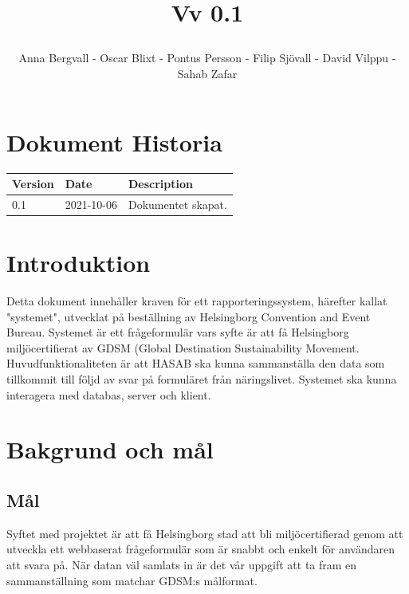 \documentclass{article}
\date {#1}
\title {
    \documentNumber {01}    

    \documentTitle {Helsingborg Event and Convention Bureau}
    
    \documentDate {2021-08-20}
    \documentVersion Vv 0.1
    
    \author{Anna Bergvall - Oscar Blixt - Pontus Persson - Filip Sjövall - David Vilppu - Sahab Zafar}
}
\begin{document}
\maketitle

\thispagestyle{empty}



\newpage

\tableofcontents


\newpage

\section{Dokument Historia}
\begin{tabular}{ l | l | l }
    Version & Date & Description \\
    \hline
    0.1 & 2021-10-06 & Dokumentet skapat. \\
    
\end{tabular}

\section{Introduktion}
    Detta dokument innehåller kraven för ett rapporteringssystem, härefter kallat "systemet", utvecklat på beställning av Helsingborg Convention and Event Bureau. Systemet är ett frågeformulär vars syfte är att få Helsingborg miljöcertifierat av GDSM (Global Destination Sustainability Movement. Huvudfunktionaliteten är att HASAB ska kunna sammanställa den data som tillkommit till följd av svar på formuläret från näringslivet. Systemet ska kunna interagera med databas, server och klient.
    

\section{Bakgrund och mål}

    \subsection{Mål}
      Syftet med projektet är att få Helsingborg stad att bli miljöcertifierad genom att utveckla ett webbaserat frågeformulär som är snabbt och enkelt för användaren att svara på. När datan väl samlats in är det vår uppgift att ta fram en sammanställning som matchar GDSM:s målformat.
        
\end{document}
